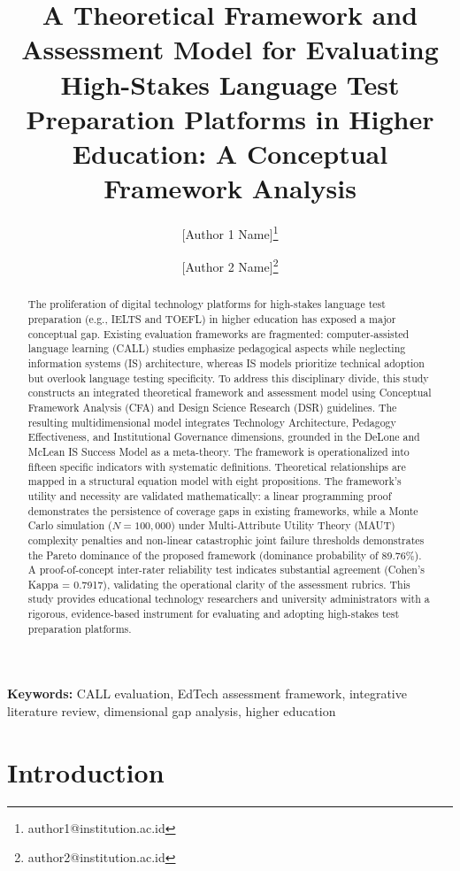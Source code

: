 \documentclass[11pt,a4paper]{article}
\title{\textbf{A Theoretical Framework and Assessment Model for Evaluating High-Stakes Language Test Preparation Platforms in Higher Education: A Conceptual Framework Analysis}}
\author[1]{[Author 1 Name]\thanks{author1@institution.ac.id}}
\author[1]{[Author 2 Name]\thanks{author2@institution.ac.id}}
\affil[1]{[Department, Faculty], [Institution Name], [City, Country]}
\date{}
\begin{document}
\maketitle

\begin{abstract}
The proliferation of digital technology platforms for high-stakes language test preparation (e.g., IELTS and TOEFL) in higher education has exposed a major conceptual gap. Existing evaluation frameworks are fragmented: computer-assisted language learning (CALL) studies emphasize pedagogical aspects while neglecting information systems (IS) architecture, whereas IS models prioritize technical adoption but overlook language testing specificity. To address this disciplinary divide, this study constructs an integrated theoretical framework and assessment model using Conceptual Framework Analysis (CFA) and Design Science Research (DSR) guidelines. The resulting multidimensional model integrates Technology Architecture, Pedagogy Effectiveness, and Institutional Governance dimensions, grounded in the DeLone and McLean IS Success Model as a meta-theory. The framework is operationalized into fifteen specific indicators with systematic definitions. Theoretical relationships are mapped in a structural equation model with eight propositions. The framework's utility and necessity are validated mathematically: a linear programming proof demonstrates the persistence of coverage gaps in existing frameworks, while a Monte Carlo simulation ($N = 100,000$) under Multi-Attribute Utility Theory (MAUT) complexity penalties and non-linear catastrophic joint failure thresholds demonstrates the Pareto dominance of the proposed framework (dominance probability of 89.76\%). A proof-of-concept inter-rater reliability test indicates substantial agreement (Cohen's Kappa = 0.7917), validating the operational clarity of the assessment rubrics. This study provides educational technology researchers and university administrators with a rigorous, evidence-based instrument for evaluating and adopting high-stakes test preparation platforms.
\end{abstract}

\noindent \textbf{Keywords:} CALL evaluation, EdTech assessment framework, integrative literature review, dimensional gap analysis, higher education

\newpage

\section{Introduction}
\label{sec:intro}
\end{document}
